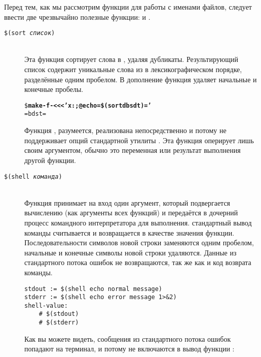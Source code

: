 Перед тем, как мы рассмотрим функции для работы с именами файлов,
следует ввести две чрезвычайно полезные функции:  и
.

\begin{description}
\item[\texttt{\${}(sort \emph{список})}] \hfill \\
Эта функция сортирует слова в , удаляя дубликаты.
Результирующий список содержит уникальные слова из 
в лексикографическом порядке, разделённые одним пробелом. В дополнение
функция  удаляет начальные и конечные пробелы.

{\footnotesize
\begin{alltt}
\${} \textbf{make -f- <<< 'x:;@echo =\${}(sort d b s d t )='}
=b d s t=
\end{alltt}
}

Функция , разумеется, реализована непосредственно
\GNUmake{} и потому не поддерживает опций стандартной утилиты
. Эта функция оперирует лишь своим аргументом, обычно
это переменная или результат выполнения другой функции.

\item[\texttt{\${}(shell \emph{команда})}] \hfill \\
Функция  принимает на вход один аргумент, который
подвергается вычислению (как аргументы всех функций) и передаётся в
дочерний процесс командного интерпретатора для выполнения.
стандартный вывод команды считывается и возвращается в качестве
значения функции. Последовательности символов новой строки заменяются
одним пробелом, начальные и конечные символы новой строки удаляются.
Данные из стандартного потока ошибок не возвращаются, так же как и код
возврата команды.

{\footnotesize
\begin{verbatim}
stdout := $(shell echo normal message)
stderr := $(shell echo error message 1>&2)
shell-value:
    # $(stdout)
    # $(stderr)
\end{verbatim}
}

Как вы можете видеть, сообщения из стандартного потока ошибок попадают
на терминал, и потому не включаются в вывод функции :


\end{description}
